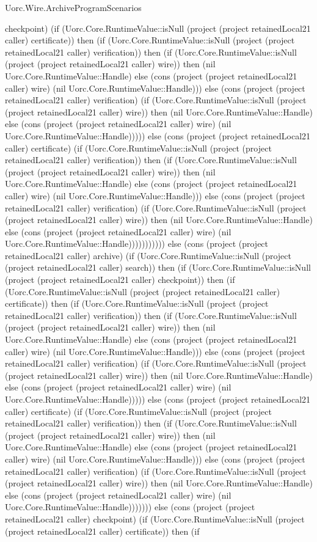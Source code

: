 \begin{lexlean}{Uorc.Wire.ArchiveProgramScenarios}
\begin{semanticmodule}
{checkpoint) (if (Uorc.Core.RuntimeValue::isNull (project (project retainedLocal21 caller) certificate)) then (if (Uorc.Core.RuntimeValue::isNull (project (project retainedLocal21 caller) verification)) then (if (Uorc.Core.RuntimeValue::isNull (project (project retainedLocal21 caller) wire)) then (nil Uorc.Core.RuntimeValue::Handle) else (cons (project (project retainedLocal21 caller) wire) (nil Uorc.Core.RuntimeValue::Handle))) else (cons (project (project retainedLocal21 caller) verification) (if (Uorc.Core.RuntimeValue::isNull (project (project retainedLocal21 caller) wire)) then (nil Uorc.Core.RuntimeValue::Handle) else (cons (project (project retainedLocal21 caller) wire) (nil Uorc.Core.RuntimeValue::Handle))))) else (cons (project (project retainedLocal21 caller) certificate) (if (Uorc.Core.RuntimeValue::isNull (project (project retainedLocal21 caller) verification)) then (if (Uorc.Core.RuntimeValue::isNull (project (project retainedLocal21 caller) wire)) then (nil Uorc.Core.RuntimeValue::Handle) else (cons (project (project retainedLocal21 caller) wire) (nil Uorc.Core.RuntimeValue::Handle))) else (cons (project (project retainedLocal21 caller) verification) (if (Uorc.Core.RuntimeValue::isNull (project (project retainedLocal21 caller) wire)) then (nil Uorc.Core.RuntimeValue::Handle) else (cons (project (project retainedLocal21 caller) wire) (nil Uorc.Core.RuntimeValue::Handle))))))))))) else (cons (project (project retainedLocal21 caller) archive) (if (Uorc.Core.RuntimeValue::isNull (project (project retainedLocal21 caller) search)) then (if (Uorc.Core.RuntimeValue::isNull (project (project retainedLocal21 caller) checkpoint)) then (if (Uorc.Core.RuntimeValue::isNull (project (project retainedLocal21 caller) certificate)) then (if (Uorc.Core.RuntimeValue::isNull (project (project retainedLocal21 caller) verification)) then (if (Uorc.Core.RuntimeValue::isNull (project (project retainedLocal21 caller) wire)) then (nil Uorc.Core.RuntimeValue::Handle) else (cons (project (project retainedLocal21 caller) wire) (nil Uorc.Core.RuntimeValue::Handle))) else (cons (project (project retainedLocal21 caller) verification) (if (Uorc.Core.RuntimeValue::isNull (project (project retainedLocal21 caller) wire)) then (nil Uorc.Core.RuntimeValue::Handle) else (cons (project (project retainedLocal21 caller) wire) (nil Uorc.Core.RuntimeValue::Handle))))) else (cons (project (project retainedLocal21 caller) certificate) (if (Uorc.Core.RuntimeValue::isNull (project (project retainedLocal21 caller) verification)) then (if (Uorc.Core.RuntimeValue::isNull (project (project retainedLocal21 caller) wire)) then (nil Uorc.Core.RuntimeValue::Handle) else (cons (project (project retainedLocal21 caller) wire) (nil Uorc.Core.RuntimeValue::Handle))) else (cons (project (project retainedLocal21 caller) verification) (if (Uorc.Core.RuntimeValue::isNull (project (project retainedLocal21 caller) wire)) then (nil Uorc.Core.RuntimeValue::Handle) else (cons (project (project retainedLocal21 caller) wire) (nil Uorc.Core.RuntimeValue::Handle))))))) else (cons (project (project retainedLocal21 caller) checkpoint) (if (Uorc.Core.RuntimeValue::isNull (project (project retainedLocal21 caller) certificate)) then (if }
\end{semanticmodule}
\end{lexlean}
